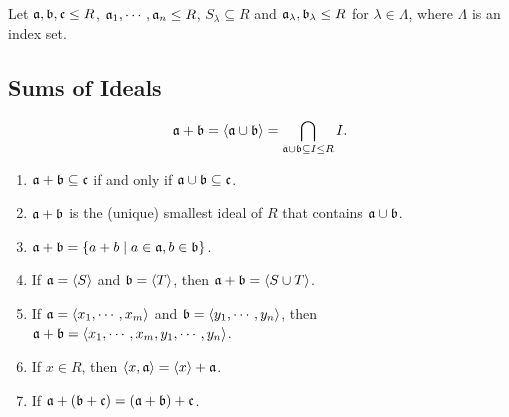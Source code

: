 Let $\mathfrak{a},\mathfrak{b},\mathfrak{c} \leq R$, $\mathfrak{a}_1,\cdots,\mathfrak{a}_n \leq R$, $S_\lambda \subseteq R$ and $\mathfrak{a}_\lambda,\mathfrak{b}_\lambda \leq R$ for $\lambda \in \Lambda$, where $\Lambda$ is an index set.

\subsection*{Sums of Ideals}

\begin{definition}
    \[\mathfrak{a} + \mathfrak{b} = \langle \mathfrak{a} \cup \mathfrak{b} \rangle = \bigcap_{\mathfrak{a} \cup \mathfrak{b} \subseteq I \leq R}I.\]
\end{definition}

\begin{fact}
    \begin{enumerate}
        \item $\mathfrak{a} + \mathfrak{b} \subseteq \mathfrak{c}$ if and only if $\mathfrak{a} \cup \mathfrak{b} \subseteq \mathfrak{c}$.
        \item $\mathfrak{a} + \mathfrak{b}$ is the (unique) smallest ideal of $R$ that contains $\mathfrak{a} \cup \mathfrak{b}$.
        \item $\mathfrak{a} + \mathfrak{b} = \{a + b \mid a \in \mathfrak{a}, b \in \mathfrak{b}\}$.
        \item If $\mathfrak{a} = \langle S \rangle$ and $\mathfrak{b} = \langle T \rangle$, then $\mathfrak{a} + \mathfrak{b} = \langle S \cup T \rangle$.
        \item If $\mathfrak{a} = \langle x_1,\cdots,x_m \rangle$ and $\mathfrak{b} = \langle y_1,\cdots,y_n \rangle$, then $\mathfrak{a} + \mathfrak{b} = \langle x_1,\cdots,x_m, y_1,\cdots,y_n \rangle$.
        \item If $x \in R$, then $\langle x,\mathfrak{a} \rangle = \langle x \rangle + \mathfrak{a}$.
        \item If $\mathfrak{a} + (\mathfrak{b} + \mathfrak{c}) = (\mathfrak{a} + \mathfrak{b}) + \mathfrak{c}$.
    \end{enumerate}
\end{fact}

